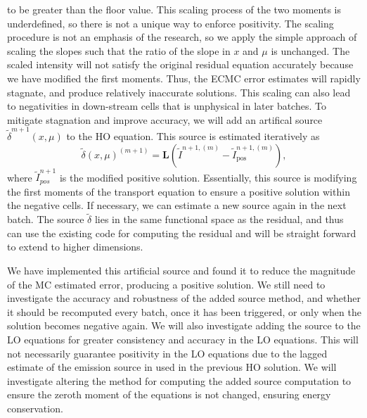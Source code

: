 to be greater than the floor
value.  This scaling process of the two moments is underdefined, so there is not a unique way to enforce
positivity.  The scaling procedure is not an emphasis of the research, so we apply the simple
approach of scaling the slopes such that the ratio of the slope in $x$ and $\mu$ is
unchanged.  The scaled intensity will not satisfy the original residual equation accurately because we have
modified the first moments.   Thus, the ECMC error estimates will rapidly stagnate,
and produce relatively inaccurate solutions.  This scaling can also lead to
negativities in down-stream cells that is unphysical in later batches.  To mitigate
stagnation and improve accuracy, we will add an artifical source $\tilde\delta^{m+1}(x,\mu)$ to the HO equation.
This source is estimated iteratively as
\begin{equation*}
    \tilde\delta(x,\mu)^{(m+1)} = \mathbf{L}(\tilde{I}^{n+1,(m)} -
    \tilde{I}^{n+1,(m)}_{\text{pos}}),
\end{equation*}
where $\tilde{I}_{pos}^{n+1}$ is the modified positive solution.
Essentially, this source is modifying the first moments of the transport equation to
ensure a positive solution within the negative cells.   If necessary, we can estimate a
new source again in the next batch.  The source
$\tilde\delta$ lies in the same functional space as the residual, and thus can use
the existing code for computing the residual and will be straight forward to extend
to higher dimensions.  

We have implemented this artificial source and found it to reduce the
magnitude of the MC estimated error, producing a positive solution. We still need to
investigate the accuracy and robustness of the
added source method, and whether it should be recomputed every batch, once it has been
triggered, or only when the
solution becomes negative again.   We will also
investigate adding the source to the LO equations for greater consistency and accuracy in
the LO equations.  This will not
necessarily guarantee positivity in the LO equations due to the lagged estimate of the emission source in
used in the previous HO solution.  We will investigate altering the  method for computing the added source computation to ensure the zeroth moment
of the equations is not changed, ensuring energy conservation.
